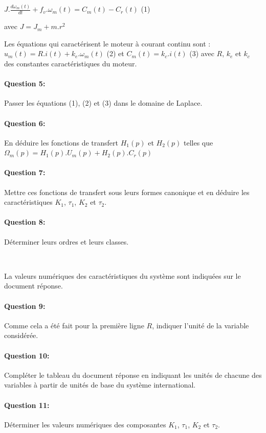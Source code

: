 \begin{center}
$J.\frac{d\omega_m(t)}{dt}+f_v.\omega_m(t)=C_m(t)-C_r(t)$ (1)
\end{center}
avec $J=J_m+m.r^2$

Les équations qui caractérisent le moteur à courant continu sont : $u_m(t)=R.i(t)+k_e.\omega_m(t)$ (2) et $C_m(t)=k_c.i(t)$ (3) avec $R$, $k_e$ et $k_c$ des constantes caractéristiques du moteur.

\paragraph{Question 5:} Passer les équations (1), (2) et (3) dans le domaine de Laplace.

\paragraph{Question 6:} En déduire les fonctions de transfert $H_1(p)$ et $H_2(p)$ telles que $\Omega_m(p)=H_1(p).U_m(p)+H_2(p).C_r(p)$

\paragraph{Question 7:} Mettre ces fonctions de transfert sous leurs formes canonique et en déduire les caractéristiques $K_1$, $\tau_1$, $K_2$ et $\tau_2$.

\paragraph{Question 8:} Déterminer leurs ordres et leurs classes.

~\

La valeurs numériques des caractéristiques du système sont indiquées sur le document réponse.

\paragraph{Question 9:} Comme cela a été fait pour la première ligne $R$, indiquer l'unité de la variable considérée. 

\paragraph{Question 10:} Compléter le tableau du document réponse en indiquant les unités de chacune des variables à partir de unités de base du système international. 

\paragraph{Question 11:} Déterminer les valeurs numériques des composantes $K_1$, $\tau_1$, $K_2$ et $\tau_2$.
 
